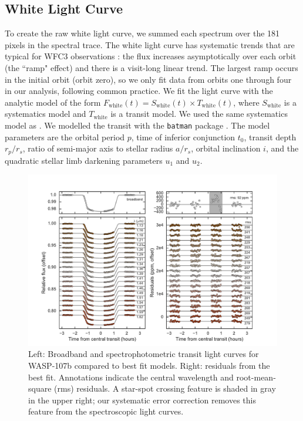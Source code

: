 \documentclass[twocolumn, trackchanges]{aastex61}
\begin{document}
\subsection{White Light Curve}
To create the raw white light curve, we summed each spectrum over the 181 pixels in the spectral trace.  The white light curve has systematic trends that are typical for WFC3 observations \citep{zhou17}: the flux increases asymptotically over each orbit (the ``ramp" effect) and there is a visit-long linear trend. The largest ramp occurs in the initial orbit (orbit zero), so we only fit data from orbits one through four in our analysis, following common practice.  We fit the light curve with the analytic model of the form $F_\mathrm{white}(t) = S_\mathrm{white}(t)\times T_\mathrm{white}(t)$, where $S_\mathrm{white}$ is a systematics model and $T_\mathrm{white}$ is a transit model. We used the same systematics model as \cite{kreidberg15b}.  We modelled the transit with the \texttt{batman} package \citep{kreidberg15a}.  The model parameters are the orbital period $p$, time of inferior conjunction $t_0$, transit depth $r_p/r_s$, ratio of semi-major axis to stellar radius $a/r_s$, orbital inclination $i$, and the quadratic stellar limb darkening parameters $u_1$ and $u_2$.

\begin{figure}
\includegraphics[width = \textwidth]{Figures/fig1_lc.pdf}
\caption{Left: Broadband and spectrophotometric transit light curves for WASP-107b compared to best fit models. Right: residuals from the best fit. Annotations indicate the central wavelength and root-mean-square (rms) residuals. A star-spot crossing feature is shaded in gray in the upper right; our systematic error correction removes this feature from the spectroscopic light curves.} 
\label{fig:lc}
\end{figure}
\end{document}
